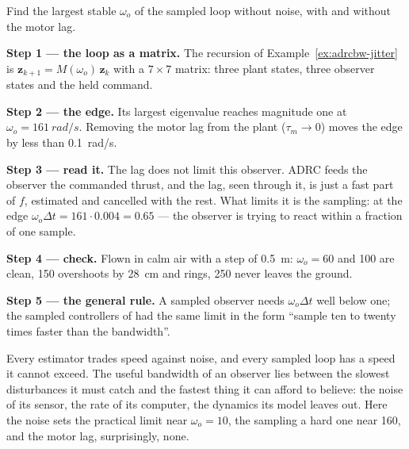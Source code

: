 \begin{example}
\label{ex:adrcbw-edge}
Find the largest stable $\omega_o$ of the sampled loop without noise, with and without the motor lag.

\textbf{Step 1 — the loop as a matrix.} The recursion of Example~\ref{ex:adrcbw-jitter} is $\symbf z_{k+1} = M(\omega_o)\,\symbf z_k$ with a $7 \times 7$ matrix: three plant states, three observer states and the held command.

\textbf{Step 2 — the edge.} Its largest eigenvalue reaches magnitude one at $\omega_o = \SI{161}{rad/s}$. Removing the motor lag from the plant ($\tau_m \to 0$) moves the edge by less than \SI{0.1}{rad/s}.

\textbf{Step 3 — read it.} The lag does not limit this observer. ADRC feeds the observer the commanded thrust, and the lag, seen through it, is just a fast part of $f$, estimated and cancelled with the rest. What limits it is the sampling: at the edge $\omega_o\Delta t = 161 \cdot 0.004 = 0.65$ — the observer is trying to react within a fraction of one sample.

\textbf{Step 4 — check.} Flown in calm air with a step of \SI{0.5}{m}: $\omega_o = 60$ and 100 are clean, 150 overshoots by \SI{28}{cm} and rings, 250 never leaves the ground.

\textbf{Step 5 — the general rule.} A sampled observer needs $\omega_o\Delta t$ well below one; the sampled controllers of  had the same limit in the form \enquote{sample ten to twenty times faster than the bandwidth}.
\end{example}

\begin{keyidea}
Every estimator trades speed against noise, and every sampled loop has a speed it cannot exceed. The useful bandwidth of an observer lies between the slowest disturbances it must catch and the fastest thing it can afford to believe: the noise of its sensor, the rate of its computer, the dynamics its model leaves out. Here the noise sets the practical limit near $\omega_o = 10$, the sampling a hard one near 160, and the motor lag, surprisingly, none.
\end{keyidea}


